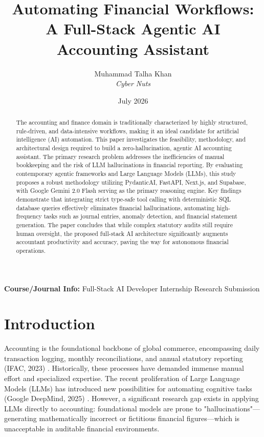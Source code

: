 \documentclass[12pt,a4paper]{article}
\title{\textbf{Automating Financial Workflows: A Full-Stack Agentic AI Accounting Assistant}}
\author{Muhammad Talha Khan \\ \textit{Cyber Nuts}}
\date{July 2026}
\begin{document}
\maketitle

\vspace{1cm}
\begin{center}
    \textbf{Course/Journal Info:} Full-Stack AI Developer Internship Research Submission
\end{center}
\vspace{1cm}

\begin{abstract}
The accounting and finance domain is traditionally characterized by highly structured, rule-driven, and data-intensive workflows, making it an ideal candidate for artificial intelligence (AI) automation. This paper investigates the feasibility, methodology, and architectural design required to build a zero-hallucination, agentic AI accounting assistant. The primary research problem addresses the inefficiencies of manual bookkeeping and the risk of LLM hallucinations in financial reporting. By evaluating contemporary agentic frameworks and Large Language Models (LLMs), this study proposes a robust methodology utilizing PydanticAI, FastAPI, Next.js, and Supabase, with Google Gemini 2.0 Flash serving as the primary reasoning engine. Key findings demonstrate that integrating strict type-safe tool calling with deterministic SQL database queries effectively eliminates financial hallucinations, automating high-frequency tasks such as journal entries, anomaly detection, and financial statement generation. The paper concludes that while complex statutory audits still require human oversight, the proposed full-stack AI architecture significantly augments accountant productivity and accuracy, paving the way for autonomous financial operations.
\end{abstract}

\newpage
\tableofcontents
\newpage

\section{Introduction}
Accounting is the foundational backbone of global commerce, encompassing daily transaction logging, monthly reconciliations, and annual statutory reporting (IFAC, 2023) \cite{ifac2023}. Historically, these processes have demanded immense manual effort and specialized expertise. The recent proliferation of Large Language Models (LLMs) has introduced new possibilities for automating cognitive tasks (Google DeepMind, 2025) \cite{gemini2025}. However, a significant research gap exists in applying LLMs directly to accounting: foundational models are prone to "hallucinations"—generating mathematically incorrect or fictitious financial figures—which is unacceptable in auditable financial environments.
\end{document}

